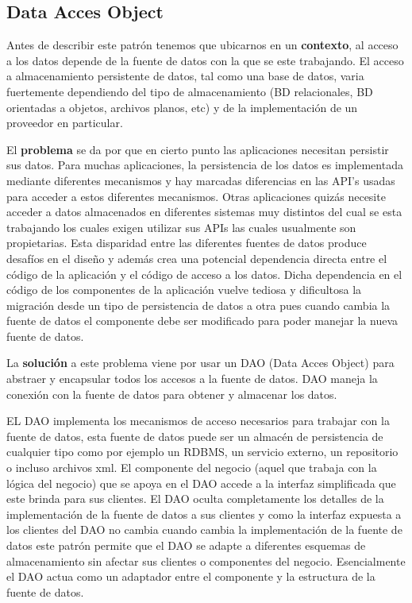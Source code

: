 \subsection{Data Acces Object}
Antes de describir este patrón tenemos que ubicarnos en un \textbf{contexto}, al acceso a los datos depende de la fuente de datos con la que se este trabajando. El acceso a almacenamiento persistente de datos, tal como una base de datos, varia fuertemente dependiendo del tipo de almacenamiento (BD relacionales, BD orientadas a objetos, archivos planos, etc) y de la implementación de un proveedor en particular.

El \textbf{problema} se da por que en cierto punto las aplicaciones necesitan persistir sus datos. Para muchas aplicaciones, la persistencia de los datos es implementada mediante diferentes mecanismos y hay marcadas diferencias en las API's usadas para acceder a estos diferentes mecanismos. Otras aplicaciones quizás necesite acceder a datos almacenados en diferentes sistemas muy distintos del cual se esta trabajando los cuales exigen utilizar sus APIs las cuales usualmente son propietarias. Esta disparidad entre las diferentes fuentes de datos produce desafíos en el diseño y además crea una potencial dependencia directa entre el código de la aplicación y el código de acceso a los datos. Dicha dependencia en el código de los componentes de la aplicación vuelve tediosa y dificultosa la migración desde un tipo de persistencia de datos a otra pues cuando cambia la fuente de datos el componente debe ser modificado para poder manejar la nueva fuente de datos.

La \textbf{solución} a este problema viene por usar un DAO (Data Acces Object) para abstraer y encapsular todos los accesos a la fuente de datos. DAO maneja la conexión con la fuente de datos para obtener y almacenar los datos.

EL DAO implementa los mecanismos de acceso necesarios para trabajar con la fuente de datos, esta fuente de datos puede ser un almacén de persistencia de cualquier tipo como por ejemplo un RDBMS, un servicio externo, un repositorio o incluso archivos xml. El componente del negocio (aquel que trabaja con la lógica del negocio) que se apoya en el DAO accede a la interfaz simplificada que este brinda para sus clientes. El DAO oculta completamente los detalles de la implementación de la fuente de datos a sus clientes y como la interfaz expuesta a los clientes del DAO no cambia cuando cambia la implementación de la fuente de datos este patrón permite que el DAO se adapte a diferentes esquemas de almacenamiento sin afectar sus clientes o componentes del negocio. Esencialmente el DAO actua como un adaptador entre el componente y la estructura de la fuente de datos.

